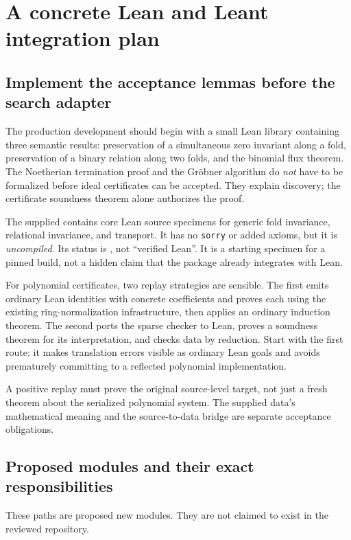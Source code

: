 \section{A concrete Lean and Leant integration plan}
\label{sec:integration}

\subsection{Implement the acceptance lemmas before the search adapter}

The production development should begin with a small Lean library containing three semantic results: preservation of a simultaneous zero invariant along a fold, preservation of a binary relation along two folds, and the binomial flux theorem. The Noetherian termination proof and the Gr\"obner algorithm do \emph{not} have to be formalized before ideal certificates can be accepted. They explain discovery; the certificate soundness theorem alone authorizes the proof.

The supplied  contains core Lean source specimens for generic fold invariance, relational invariance, and transport. It has no \texttt{sorry} or added axioms, but it is \emph{uncompiled}. Its status is , not ``verified Lean''. It is a starting specimen for a pinned build, not a hidden claim that the package already integrates with Lean.

For polynomial certificates, two replay strategies are sensible. The first emits ordinary Lean identities with concrete coefficients and proves each using the existing ring-normalization infrastructure, then applies an ordinary induction theorem. The second ports the sparse checker to Lean, proves a soundness theorem for its interpretation, and checks data by reduction. Start with the first route: it makes translation errors visible as ordinary Lean goals and avoids prematurely committing to a reflected polynomial implementation.

A positive replay must prove the original source-level target, not just a fresh theorem about the serialized polynomial system. The supplied data's mathematical meaning and the source-to-data bridge are separate acceptance obligations.

\subsection{Proposed modules and their exact responsibilities}

These paths are proposed new modules. They are not claimed to exist in the reviewed repository.

